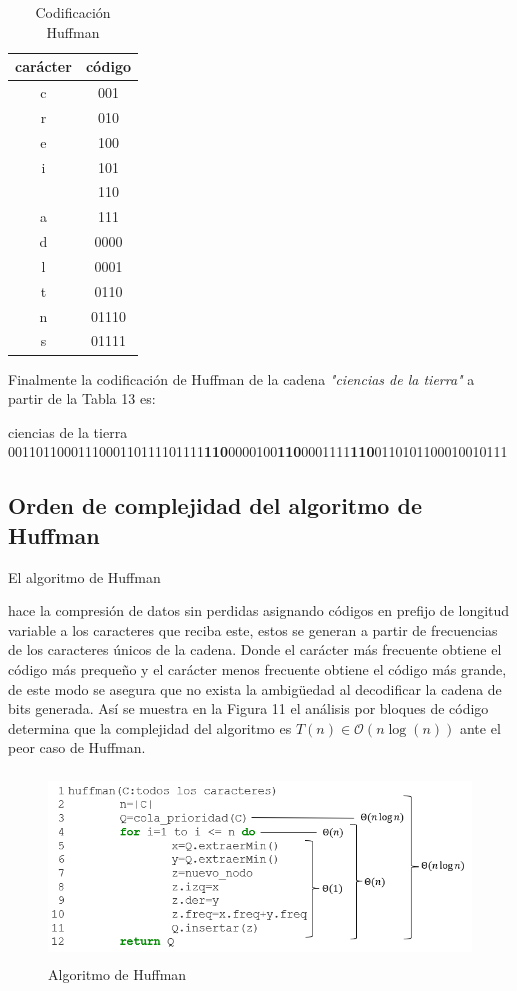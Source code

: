 \documentclass[12pt,twoside]{article}
\begin{document}
    \begin{longtable}{|c|c|}
        \caption{Codificaci\'on Huffman}\\
        \hline
            {car\'acter}&{c\'odigo}\\
        \hline
            {c}&{001}\\
        \hline
            {r}&{010}\\
        \hline
            {e}&{100}\\
        \hline
            {i}&{101}\\
        \hline
            { }&{110}\\
        \hline
            {a}&{111}\\
        \hline
            {d}&{0000}\\
        \hline
            {l}&{0001}\\
        \hline
            {t}&{0110}\\
        \hline
            {n}&{01110}\\
        \hline
            {s}&{01111}\\
        \hline
    \end{longtable}
    
    Finalmente la codificaci\'on de Huffman de la cadena {\it "ciencias de la tierra"} a partir de la Tabla 13 es:\\
    \begin{center}
        {\Large ciencias de la tierra }\\
        0011011000111000110111101111{\bf 110}0000100{\bf 110}0001111{\bf 110}0110101100010010111  
    \end{center}
    \subsection{Orden de complejidad del algoritmo de Huffman}
        \hypertarget{Anexo}{El algoritmo de Huffman} hace la compresi\'on de datos sin perdidas asignando c\'odigos en prefijo de longitud variable a los caracteres que reciba este, estos se generan a partir de frecuencias de los caracteres \'unicos de la cadena. Donde el car\'acter m\'as frecuente obtiene el c\'odigo m\'as preque\~no y el car\'acter menos frecuente obtiene el c\'odigo m\'as grande, de este modo se asegura que no exista la ambigüedad al decodificar la cadena de bits generada. As\'i se muestra en la Figura 11 el an\'alisis por bloques de c\'odigo determina que la complejidad del algoritmo es $T(n)\in\mathcal{O}(n\log(n))$ ante el peor caso de Huffman.
        \begin{figure}[H]
        \centering
        \includegraphics[height=5cm]{imagenes/complejidad_huffman.png}
        \caption{Algoritmo de Huffman}
    \end{figure}
\end{document}
